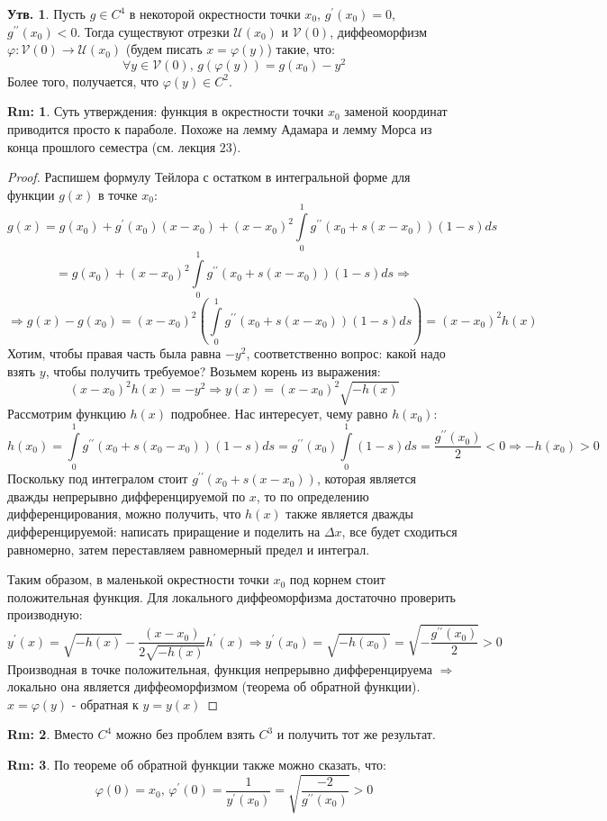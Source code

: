 \documentclass[12pt]{article}
\newcommand{\MU}{\mathcal{U}}
\newcommand{\MV}{\mathcal{V}}
\theoremstyle{definition}
\newtheorem{rem}{Rm:}
\newtheorem{prop}{Утв.}
\newcommand{\ddint}[2]{\displaystyle\int\limits_{#1}^{#2}}
\begin{document}
\begin{prop}
	Пусть $g \in C^4$ в некоторой окрестности точки $x_0$, $g^\prime(x_0) = 0$, $g^{\prime\prime}(x_0) < 0$. Тогда существуют отрезки $\MU(x_0)$ и $\MV(0)$, диффеоморфизм $\varphi \colon \MV(0) \to \MU(x_0)$ (будем писать $x = \varphi(y)$) такие, что:
	$$
		\forall y \in \MV(0), \, g(\varphi(y)) = g(x_0) - y^2
	$$
	Более того, получается, что $\varphi(y) \in C^2$.
\end{prop}
\begin{rem}
	Суть утверждения: функция в окрестности точки $x_0$ заменой координат приводится просто к параболе. Похоже на лемму Адамара и лемму Морса из конца прошлого семестра (см. лекция $23$). 
\end{rem}
\begin{proof}
	Распишем формулу Тейлора с остатком в интегральной форме для функции $g(x)$ в точке $x_0$:
	$$
		g(x) = g(x_0) + g^\prime(x_0)(x - x_0) + (x - x_0)^2\ddint{0}{1}g^{\prime\prime}(x_0 + s(x - x_0))(1-s)ds 
	$$
	$$
		= g(x_0) + (x - x_0)^2\ddint{0}{1}g^{\prime\prime}(x_0 + s(x - x_0))(1-s)ds \Rightarrow
	$$
	$$
		 \Rightarrow g(x) - g(x_0) = (x - x_0)^2\left(\ddint{0}{1}g^{\prime\prime}(x_0 + s(x - x_0))(1-s)ds\right) = (x-x_0)^2h(x)
	$$
	Хотим, чтобы правая часть была равна $-y^2$, соответственно вопрос: какой надо взять $y$, чтобы получить требуемое? Возьмем корень из выражения:
	$$
		(x-x_0)^2h(x) = -y^2 \Rightarrow y(x) = (x - x_0)^2\sqrt{-h(x)}
	$$
	Рассмотрим функцию $h(x)$ подробнее. Нас интересует, чему равно $h(x_0)$:
	$$
		h(x_0) = \ddint{0}{1}g^{\prime\prime}(x_0 + s(x_0 - x_0))(1-s)ds = g^{\prime\prime}(x_0)\ddint{0}{1}(1-s)ds = \dfrac{g^{\prime\prime}(x_0)}{2} < 0 \Rightarrow -h(x_0) > 0
	$$
	Поскольку под интегралом стоит $g^{\prime\prime}(x_0 + s(x - x_0))$, которая является дважды непрерывно дифференцируемой по $x$, то по определению дифференцирования, можно получить, что $h(x)$ также является дважды дифференцируемой: написать приращение и поделить на $\Delta x$, все будет сходиться равномерно, затем переставляем равномерный предел и интеграл. 
	
	Таким образом, в маленькой окрестности точки $x_0$ под корнем стоит положительная функция. Для локального диффеоморфизма достаточно  проверить производную:
	$$
		y^\prime(x) = \sqrt{-h(x)} - \dfrac{(x - x_0)}{2\sqrt{-h(x)}}h^\prime(x) \Rightarrow y^\prime(x_0) = \sqrt{-h(x_0)}  = \sqrt{-\dfrac{g^{\prime\prime}(x_0)}{2}} > 0
	$$
	Производная в точке положительная, функция непрерывно дифференцируема $\Rightarrow$ локально она является диффеоморфизмом (теорема об обратной функции).
	$x = \varphi(y)$ - обратная к $y = y(x)$
\end{proof}
\begin{rem}
	Вместо $C^4$ можно без проблем взять $C^3$ и получить тот же результат.
\end{rem}
\begin{rem}
	По теореме об обратной функции также можно сказать, что:
	$$
		\varphi(0) = x_0, \, \varphi^\prime(0) = \dfrac{1}{y^\prime(x_0)} = \sqrt{\dfrac{-2}{g^{\prime\prime}(x_0)}} > 0
	$$
\end{rem}
\end{document}
